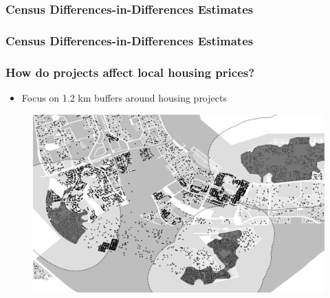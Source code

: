 \documentclass[aspectratio=149]{beamer}
\begin{document}



\begin{frame}
\frametitle{Census Differences-in-Differences Estimates}

\resizebox{\textwidth}{!}{  

}

\end{frame}



\begin{frame}
\frametitle{Census Differences-in-Differences Estimates}

\resizebox{\textwidth}{!}{  

}

\end{frame}













\begin{frame}
\frametitle{How do projects affect local housing prices?}
\begin{itemize}
  \item Focus on 1.2 km buffers around housing projects
\end{itemize}
\begin{center}
\begin{figure}
\includegraphics[scale=0.30]{design2.png}
\vspace{-3mm}
\end{figure}
\end{center}
\end{frame}
\end{document}
